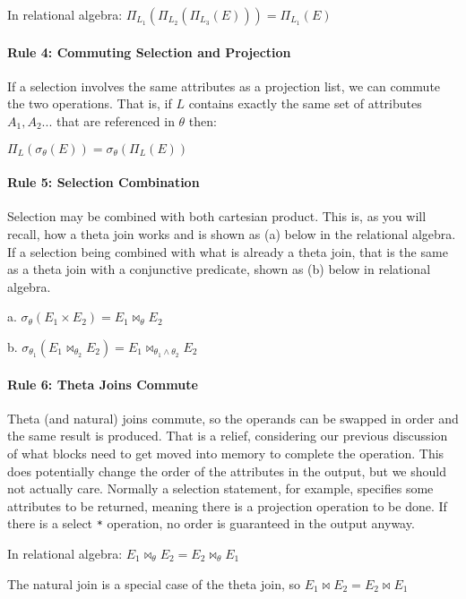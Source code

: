 \documentclass[a4paper]{report}
\begin{document}
In relational algebra: $\Pi_{L_{1}}(\Pi_{L_{2}}(\Pi_{L_{3}}(E))) = \Pi_{L_{1}}(E)$

\paragraph{Rule 4: Commuting Selection and Projection}
If a selection involves the same attributes as a projection list, we can commute the two operations. That is, if $L$ contains exactly the same set of attributes $A_{1}, A_{2}...$ that are referenced in $\theta$ then:

$\Pi_{L}(\sigma_{\theta}(E)) = \sigma_{\theta}(\Pi_{L}(E))$

\paragraph{Rule 5: Selection Combination}

Selection may be combined with both cartesian product. This is, as you will recall, how a theta join works and is shown as (a) below in the relational algebra. If a selection being combined with what is already a theta join, that is the same as a theta join with a conjunctive predicate, shown as (b) below in relational algebra.

a. $\sigma_{\theta}(E_{1} \times E_{2}) = E_{1} \bowtie_{\theta} E_{2}$

b. $\sigma_{\theta_{1}}( E_{1} \bowtie_{\theta_{2}} E_{2}) = E_{1} \bowtie_{\theta_{1}\wedge\theta_{2}} E_{2}$

\paragraph{Rule 6: Theta Joins Commute}
Theta (and natural) joins commute, so the operands can be swapped in order and the same result is produced. That is a relief, considering our previous discussion of what blocks need to get moved into memory to complete the operation. This does potentially change the order of the attributes in the output, but we should not actually care. Normally a selection statement, for example, specifies some attributes to be returned, meaning there is a projection operation to be done. If there is a select \texttt{*} operation, no order is guaranteed in the output anyway.

In relational algebra: $E_{1} \bowtie_{\theta} E_{2} = E_{2} \bowtie_{\theta} E_{1}$

The natural join is a special case of the theta join, so $E_{1} \bowtie E_{2} = E_{2} \bowtie E_{1}$
\end{document}
